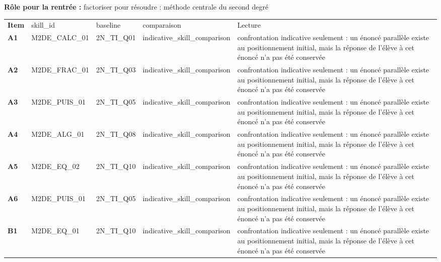 \documentclass[10pt,a4paper]{article}
\begin{document}
\par\vspace{1mm}\small\textbf{Rôle pour la rentrée :} factoriser pour résoudre : méthode centrale du second degré
\par\vspace{2mm}
\newpage{}
\par\noindent\begin{tabularx}{\linewidth}{>{\bfseries}p{9mm} >{\ttfamily\scriptsize}p{25mm} >{\ttfamily\scriptsize}p{22mm} >{\ttfamily\scriptsize}p{16mm} X}
\rowcolor{Navy}\color{white}Item & \color{white}\scriptsize skill\_id & \color{white}\scriptsize baseline & \color{white}\scriptsize comparaison & \color{white}Lecture \\
A1 & M2DE\_CALC\_01 & 2N\_TI\_Q01 & indicative\_skill\_comparison & confrontation indicative seulement : un énoncé parallèle existe au positionnement initial, mais la réponse de l'élève à cet énoncé n'a pas été conservée \\
A2 & M2DE\_FRAC\_01 & 2N\_TI\_Q03 & indicative\_skill\_comparison & confrontation indicative seulement : un énoncé parallèle existe au positionnement initial, mais la réponse de l'élève à cet énoncé n'a pas été conservée \\
A3 & M2DE\_PUIS\_01 & 2N\_TI\_Q05 & indicative\_skill\_comparison & confrontation indicative seulement : un énoncé parallèle existe au positionnement initial, mais la réponse de l'élève à cet énoncé n'a pas été conservée \\
A4 & M2DE\_ALG\_01 & 2N\_TI\_Q08 & indicative\_skill\_comparison & confrontation indicative seulement : un énoncé parallèle existe au positionnement initial, mais la réponse de l'élève à cet énoncé n'a pas été conservée \\
A5 & M2DE\_EQ\_02 & 2N\_TI\_Q10 & indicative\_skill\_comparison & confrontation indicative seulement : un énoncé parallèle existe au positionnement initial, mais la réponse de l'élève à cet énoncé n'a pas été conservée \\
A6 & M2DE\_PUIS\_01 & 2N\_TI\_Q05 & indicative\_skill\_comparison & confrontation indicative seulement : un énoncé parallèle existe au positionnement initial, mais la réponse de l'élève à cet énoncé n'a pas été conservée \\
B1 & M2DE\_EQ\_01 & 2N\_TI\_Q10 & indicative\_skill\_comparison & confrontation indicative seulement : un énoncé parallèle existe au positionnement initial, mais la réponse de l'élève à cet énoncé n'a pas été conservée \\

\end{tabularx}
\end{document}
